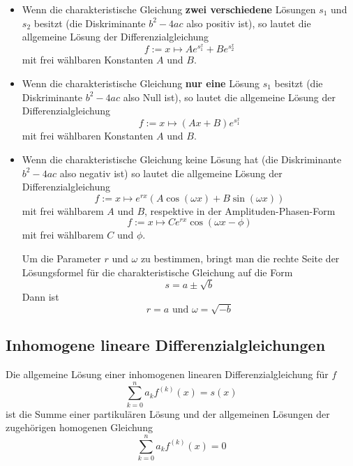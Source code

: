 \documentclass[10pt,a4paper]{scrartcl}
\begin{document}
\begin{itemize}
    \item Wenn die charakteristische Gleichung \textbf{zwei verschiedene}
        Lösungen $s_1$ und $s_2$ besitzt (die Diskriminante $b^2 - 4ac$ also
        positiv ist), so lautet die allgemeine Lösung der Differenzialgleichung
        $$f := x \mapsto Ae^{s_1^x} + Be^{s_2^x}$$
        mit frei wählbaren Konstanten $A$ und $B$.
    \item Wenn die charakteristische Gleichung \textbf{nur eine} Lösung $s_1$
        besitzt (die Diskriminante $b^2 - 4ac$ also Null ist), so lautet die
        allgemeine Lösung der Differenzialgleichung
        $$f := x \mapsto (Ax + B)e^{s_1^x}$$
        mit frei wählbaren Konstanten $A$ und $B$.
    \item Wenn die charakteristische Gleichung keine Lösung hat (die
        Diskriminante $b^2 - 4ac$ also negativ ist) so lautet die allgemeine
        Lösung der Differenzialgleichung
        $$f := x \mapsto e^{rx}\left(A \cos(\omega x)
            + B \sin(\omega x)\right)$$
        mit frei wählbarem $A$ und $B$, respektive in der Amplituden-Phasen-Form
        $$f := x \mapsto Ce^{rx} \cos(\omega x - \phi)$$
        mit frei wählbarem $C$ und $\phi$.

        Um die Parameter $r$ und $\omega$ zu bestimmen, bringt man die rechte
        Seite der Lösungsformel für die charakteristische Gleichung auf die Form
        $$s = a \pm \sqrt{b}$$
        Dann ist
        $$r = a \textrm{ und } \omega = \sqrt{-b}$$
\end{itemize}


\subsection{Inhomogene lineare Differenzialgleichungen}

Die allgemeine Lösung einer inhomogenen linearen Differenzialgleichung für $f$
$$\sum_{k=0}^n a_k f^{(k)}(x) = s(x)$$
ist die Summe einer partikulären Lösung und der allgemeinen Lösungen der
zugehörigen homogenen Gleichung
$$\sum_{k=0}^n a_k f^{(k)}(x) = 0$$
\end{document}
